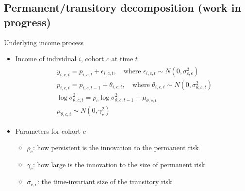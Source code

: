\documentclass{beamer}
\begin{document}




\subsection{Permanent/transitory decomposition (work in progress)}

\begin{frame}{Underlying income process}
	
	\begin{itemize}
		\item Income of individual $i$, cohort $c$ at time $t$ 
		\begin{eqnarray*}
			\begin{split}
				& y_{i,c,t} = p_{i,c,t}+ \epsilon_{i,c,t},\quad \textrm{where } \epsilon_{i,c,t} \sim N(0,\sigma^2_{c,\epsilon}) \\
				& p_{i,c,t} = p_{i,c,t-1} + \theta_{i,c,t}, \quad \textrm{where }  \theta_{i,c,t} \sim N(0,\sigma^2_{\theta,c,t} ) \\
				& \log\sigma^2_{\theta,c,t} = \rho_c \log\sigma^2_{\theta,c,t-1} + \mu_{\theta,c,t}  \\
				& \mu_{\theta,c,t} \sim N(0,\gamma_c^2)
			\end{split}
		\end{eqnarray*}

	
		\item Parameters for cohort $c$
		\begin{itemize}
			\item $\rho_{c}$: how persistent is the innovation to the permanent risk  
			\item $\gamma_c$: how large is the innovation to the size of permanent risk
			\item $\sigma_{c,\epsilon}$: the time-invariant size of the transitory risk
		\end{itemize}
	\end{itemize}
\end{frame}
\end{document}
